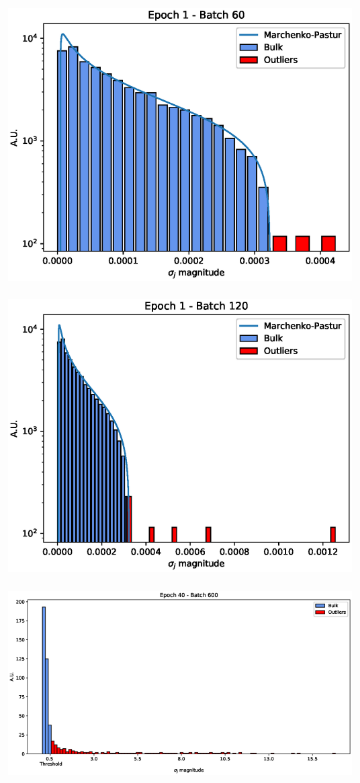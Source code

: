 \documentclass{revtex4-1}
\begin{document}
\begin{figure}
\begin{subfigure}{.45\linewidth}
    \includegraphics[width=\linewidth]{sv_distr_e1_b60.eps}
    \caption{}
    \label{fig:sv2}
  \end{subfigure}
  \begin{subfigure}{.45\linewidth}
    \includegraphics[width=\linewidth]{sv_distr_e1_b120.eps}
    \caption{} 
    \label{fig:sv3}
  \end{subfigure}
  \begin{subfigure}{.5\linewidth}
    \includegraphics[width=\linewidth]{sv_distr_e40_b600.eps}

\end{subfigure}
\end{figure}
\end{document}
